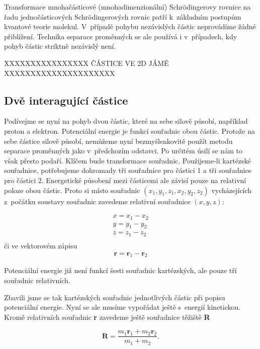 Transformace mnohačásticové (mnohadimenzionální) Schr\"odingerovy rovnice na řadu jednočásticových Schr\"odingerových rovnic patří k~základním postupům kvantové teorie molekul. V~případě pohybu nezávislých částic neprovádíme žádné přiblížení. Technika separace proměnných se ale používá i v~případech, kdy pohyb částic striktně nezávislý není.     


{\color{red}XXXXXXXXXXXXXXXX ČÁSTICE VE 2D JÁMĚ XXXXXXXXXXXXXXXXXXXXX}

\subsection{Dvě interagující částice}


Podívejme se nyní na pohyb dvou částic, které na sebe silově působí, například proton a elektron. Potenciální energie je funkcí souřadnic obou částic. Protože na sebe částice silově působí, nemůžeme nyní bezmyšlenkovitě použít metodu separace proměnných jako v~předchozím odstavci. Po určitém úsilí se nám to však přesto podaří. Klíčem bude transformace souřadnic. Použijeme-li kartézské souřadnice, potřebujeme dohromady tři souřadnice pro částici 1 a tři souřadnice pro částici 2. Energetické působení mezi částicemi ale závisí pouze na relativní poloze obou částic. Proto si místo souřadnic $(x_{1},y_{1},z_{1},x_{2},y_{2},z_{2})$ vycházejících z~počátku soustavy souřadnic zavedeme relativní souřadnice $(x,y,z)$:

\begin{eqnarray*}
x=x_{1}-x_{2}\\
y=y_{1}-y_{2}\\
z=z_{1}-z_{2}\\
\end{eqnarray*}
\noindent či ve vektorovém zápisu
\begin{eqnarray*}
\textbf{r}=\textbf{r}_{1}-\textbf{r}_{2}
\end{eqnarray*}

Potenciální energie již není funkcí šesti souřadnic kartézských, ale pouze tří souřadnic relativních.
 
Zbavili jsme se tak kartézských souřadnic jednotlivých částic při popisu potenciální energie. Nyní se ale musíme vypořádat ještě s~energií kinetickou. Kromě relativních souřadnic \textbf{r} zavedeme ještě souřadnice těžiště \textbf{R} 

\begin{equation}
\textbf{R}=\frac{m_{1}\textbf{r}_{1}+m_{2}\textbf{r}_{2}}{m_{1}+m_{2}}.
\label{rov:2č-těžiště}
\end{equation}

